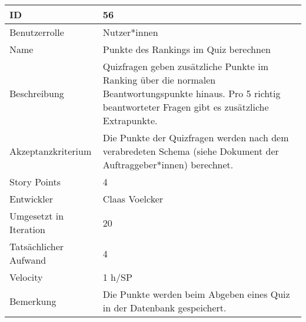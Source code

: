 \begin{tabularx}{\textwidth}{|p{}|X|}
	\hline
	ID & 56\\
	\hline
	Benutzerrolle & Nutzer*innen\\
	\hline
	Name & Punkte des Rankings im Quiz berechnen\\
	\hline
	Beschreibung & Quizfragen geben zusätzliche Punkte im Ranking über die normalen Beantwortungspunkte hinaus. Pro 5 richtig beantworteter Fragen gibt es zusätzliche Extrapunkte.\\
	\hline
	Akzeptanzkriterium & Die Punkte der Quizfragen werden nach dem verabredeten Schema (siehe Dokument der Auftraggeber*innen) berechnet.\\
	\hline
	Story Points & 4\\
	\hline
	Entwickler & Claas Voelcker\\
	\hline
	Umgesetzt in Iteration & 20\\
	\hline
	Tatsächlicher Aufwand & 4\\
	\hline
	Velocity & 1 h/SP\\
	\hline
	Bemerkung & Die Punkte werden beim Abgeben eines Quiz in der Datenbank gespeichert.\\
	\hline
\end{tabularx}
\vspace{20pt}
